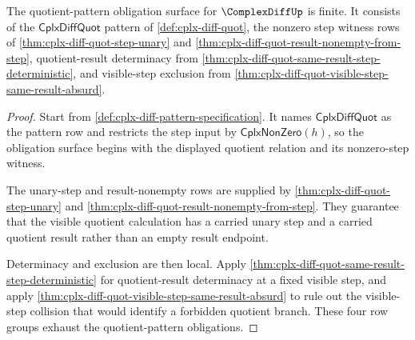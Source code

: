 \begin{theorem}
\label{thm:cplx-diff-quotient-pattern-obligation-surface}
The quotient-pattern obligation surface for $\ComplexDiffUp$ is finite. It
consists of the $\mathsf{CplxDiffQuot}$ pattern of
\autoref{def:cplx-diff-quot}, the nonzero step witness rows of
\autoref{thm:cplx-diff-quot-step-unary} and
\autoref{thm:cplx-diff-quot-result-nonempty-from-step}, quotient-result
determinacy from \autoref{thm:cplx-diff-quot-same-result-step-deterministic},
and visible-step exclusion from
\autoref{thm:cplx-diff-quot-visible-step-same-result-absurd}.
\end{theorem}
\begin{proof}
Start from \autoref{def:cplx-diff-pattern-specification}. It names
$\mathsf{CplxDiffQuot}$ as the pattern row and restricts the step input by
$\mathsf{CplxNonZero}(h)$, so the obligation surface begins with the displayed
quotient relation and its nonzero-step witness.

The unary-step and result-nonempty rows are supplied by
\autoref{thm:cplx-diff-quot-step-unary} and
\autoref{thm:cplx-diff-quot-result-nonempty-from-step}. They guarantee that the
visible quotient calculation has a carried unary step and a carried quotient
result rather than an empty result endpoint.

Determinacy and exclusion are then local. Apply
\autoref{thm:cplx-diff-quot-same-result-step-deterministic} for quotient-result
determinacy at a fixed visible step, and apply
\autoref{thm:cplx-diff-quot-visible-step-same-result-absurd} to rule out the
visible-step collision that would identify a forbidden quotient branch. These
four row groups exhaust the quotient-pattern obligations.
\end{proof}

